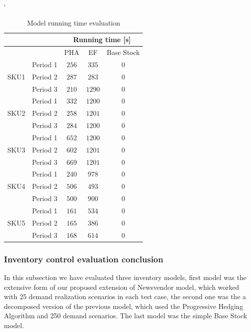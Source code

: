 \documentclass[11pt,a4paper]{article}
\begin{document}
\begin{table} \catcode`
\centering
\begin{tabular}{|c|c|c|c|c||}
\hline
\multicolumn{2}{|c|}{} &\multicolumn{3}{|c|}{Running time [s]} \\ \hline
\multicolumn{2}{|c|}{} &  PHA & EF & Base Stock \\ \hline
\multirow{ 3}{*}{SKU1}& Period 1  & $256$ & $335$ & $0$\\  \cline{2-5}
& Period 2  & $287$ & $283$ & $0$\\  \cline{2-5}
& Period 3  & $210$ & $1290$ & $0$\\ \hline 
\multirow{ 3}{*}{SKU2}& Period 1  & $332$ & $1200$ & $0$\\  \cline{2-5}
& Period 2  & $258$ & $1201$ & $0$\\  \cline{2-5}
& Period 3  & $284$ & $1200$ & $0$\\ \hline 
\multirow{ 3}{*}{SKU3}& Period 1  & $652$ & $1200$ & $0$\\  \cline{2-5}
& Period 2  & $602$ & $1201$ & $0$\\  \cline{2-5}
& Period 3  & $669$ & $1201$ & $0$\\ \hline 
\multirow{ 3}{*}{SKU4}& Period 1  & $240$ & $978$ & $0$\\  \cline{2-5}
& Period 2  & $506$ & $493$ & $0$\\  \cline{2-5}
& Period 3  & $500$ & $900$ & $0$\\ \hline 
\multirow{ 3}{*}{SKU5}& Period 1  & $161$ & $534$ & $0$\\  \cline{2-5}
& Period 2  & $165$ & $386$ & $0$\\  \cline{2-5}
& Period 3  & $168$ & $614$ & $0$\\ \hline 

\end{tabular}
\caption{Model running time evaluation}
\label{tbl:running_time}
\end{table}
\newpage


\subsubsection{Inventory control evaluation conclusion}
In this subsection we have evaluated three inventory models, first model was the extensive form of our proposed extension of Newsvendor model, which worked with 25 demand realization scenarios in each test case, the second one was the a decomposed version of the previous model, which used the Progressive Hedging Algorithm and 250 demand scenarios. The last model was the simple Base Stock model.
\end{document}
